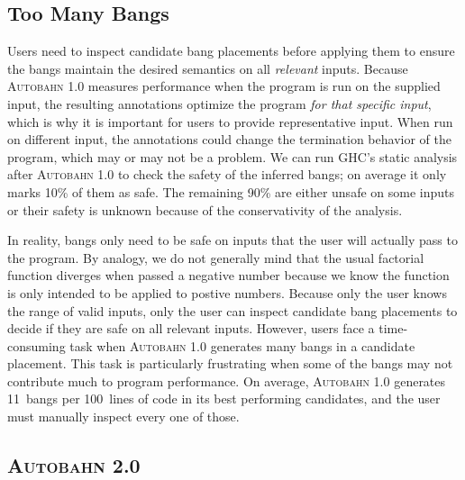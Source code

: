 \documentclass[format=sigplan, review=true]{acmart}
\newcommand{\Ao}[0]{\textsc{Autobahn 1.0}}
\newcommand{\At}[0]{\textsc{Autobahn 2.0}}
\begin{document}
\subsection{Too Many Bangs}

Users need to inspect candidate bang placements before applying them
to ensure the bangs maintain the desired semantics on all \textit{relevant}
inputs.  Because \Ao{} measures performance when the program is run on
the supplied input, the resulting annotations optimize the program
\textit{for that specific input}, which is why it is important for users
to provide representative input.  When run on different input, the
annotations could change the termination behavior of the program,
which may or may not be a problem.
We can run GHC's static analysis after
\Ao{} to check the safety of the inferred bangs; on average it
only marks 10\% of them as safe.  The remaining 90\% are either unsafe
on some inputs or their safety is unknown because of the
conservativity of the analysis.


In reality, bangs only need to be safe on inputs that the user will
actually pass to the program.  By analogy, we do not generally mind
that the usual factorial function diverges when passed a negative
number because we know the function is only intended to be applied to
postive numbers.  Because only the user knows the range of valid
inputs, only the user can inspect candidate bang placements to decide
if they are safe on all relevant inputs. However, users face a
time-consuming task when \Ao{} generates many bangs in a candidate
placement.  This task is particularly frustrating when some of the
bangs may not contribute much to program performance. On average,
\Ao{} generates 11~bangs per 100~lines of code in its best performing
candidates, and the user must manually inspect every one of those.

\subsection{\At{}}
\end{document}

